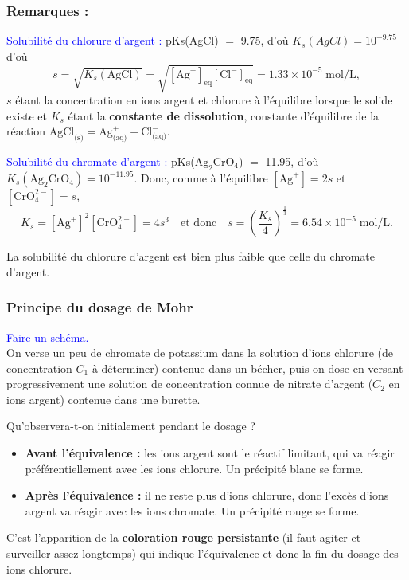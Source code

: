 \documentclass[11pt,a4paper]{report}
\begin{document}
\subsubsection*{Remarques :}
\textcolor{blue}{Solubilité du chlorure d'argent :} 
	pKs(AgCl) $=$ 9.75, d'où $K_s(AgCl) = 10^{-9.75}$
d'où
\begin{equation}
	s = \sqrt{K_s(\text{AgCl})} = \sqrt{[\text{Ag}^+]_\text{eq}[\text{Cl}^-]_\text{eq}}
	= 1.33\times10^{-5}\;\text{mol/L},
\end{equation}
$s$ étant la concentration en ions argent et chlorure à l'équilibre lorsque le solide existe et
$K_s$ étant la \textbf{constante de dissolution}, constante d'équilibre de la réaction
$\text{AgCl}_\text{(s)} = \text{Ag}^+_\text{(aq)} + \text{Cl}^-_\text{(aq)}$.

\textcolor{blue}{Solubilité du chromate d'argent :} pKs($\text{Ag}_2\text{CrO}_4$) $=$ 11.95, 
d'où $K_s(\text{Ag}_2\text{CrO}_4) = 10^{-11.95}$. Donc, comme à l'équilibre $[\text{Ag}^+] = 2s$ et $[\text{CrO}_4^{2-}] = s$,
\begin{equation}
	K_s = [\text{Ag}^+]^2[\text{CrO}_4^{2-}] = 4s^3 \quad\text{et donc}\quad s 
	= \left(\frac{K_s}{4}\right)^\frac{1}{3} = 6.54\times10^{-5}\;\text{mol/L}.
\end{equation}

La solubilité du chlorure d'argent est bien plus faible que celle du chromate d'argent.

\subsubsection*{Principe du dosage de Mohr}
\textcolor{blue}{Faire un schéma.}\\
On verse un peu de chromate de potassium dans la solution d'ions chlorure (de concentration $C_1$ à déterminer) contenue dans un bécher, puis on dose en versant progressivement une solution de concentration connue de nitrate d'argent ($C_2$ en ions argent) contenue dans une burette. 

Qu'observera-t-on initialement pendant le dosage ?
\begin{itemize}
	\item \textbf{Avant l'équivalence :} les ions argent sont le réactif limitant, qui va réagir 				préférentiellement avec les ions chlorure. Un précipité blanc se forme.
	\item \textbf{Après l'équivalence :} il ne reste plus d'ions chlorure, donc l'excès d'ions 					argent va réagir avec les ions chromate. Un précipité rouge se forme.
\end{itemize}
C'est l'apparition de la \textbf{coloration rouge persistante} (il faut agiter et surveiller assez longtemps) qui indique l'équivalence et donc la fin du dosage des ions chlorure.
\end{document}
